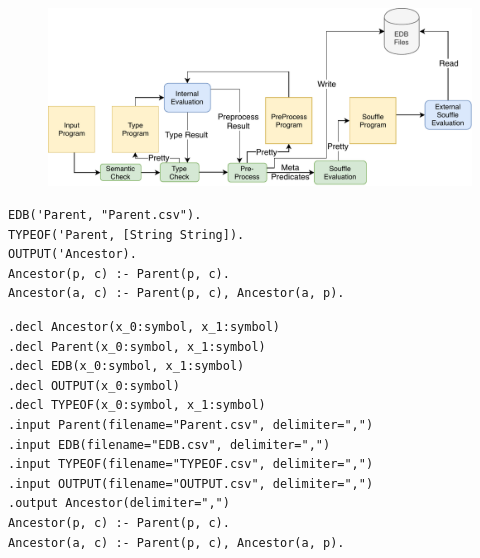 \documentclass{beamer}
\newcommand{\NL}[0]{ \hfill\\\noindent }
\begin{document}
\begin{frame}
\begin{figure}
	\vspace*{1.2cm}
	\NL
	\hspace*{-0.7cm}
	\includegraphics[scale=0.65]{./souffleEval.pdf}
\end{figure}
\end{frame}

\begin{frame}[fragile]{}

\begin{overprint}
\centering{}
\begin{verbatim}
EDB('Parent, "Parent.csv").
TYPEOF('Parent, [String String]).
OUTPUT('Ancestor).
Ancestor(p, c) :- Parent(p, c).
Ancestor(a, c) :- Parent(p, c), Ancestor(a, p).
\end{verbatim}
\centering{}
\begin{verbatim}
.decl Ancestor(x_0:symbol, x_1:symbol)
.decl Parent(x_0:symbol, x_1:symbol)
.decl EDB(x_0:symbol, x_1:symbol)
.decl OUTPUT(x_0:symbol)
.decl TYPEOF(x_0:symbol, x_1:symbol)
.input Parent(filename="Parent.csv", delimiter=",")
.input EDB(filename="EDB.csv", delimiter=",")
.input TYPEOF(filename="TYPEOF.csv", delimiter=",")
.input OUTPUT(filename="OUTPUT.csv", delimiter=",")
.output Ancestor(delimiter=",")
Ancestor(p, c) :- Parent(p, c).
Ancestor(a, c) :- Parent(p, c), Ancestor(a, p).
\end{verbatim}
\end{overprint}
\end{frame}
\def\checkmark{\tikz\fill[scale=0.4, color=green](0,.35) -- (.25,0) -- (1,.7) -- (.25,.15) -- cycle;} 
\end{document}

